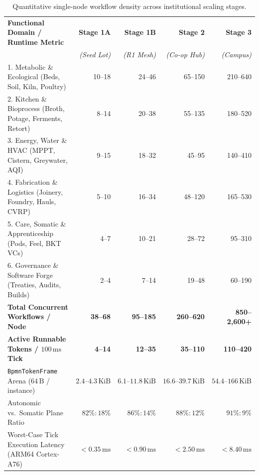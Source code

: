 \begin{table}[htbp]
\centering
\caption{Quantitative single-node workflow density across institutional scaling stages.}
\label{tab:workflow-density-stages}
\footnotesize
\begin{tabular}{@{}lrrrr@{}}
\toprule
\textbf{Functional Domain / Runtime Metric} & \textbf{Stage 1A} & \textbf{Stage 1B} & \textbf{Stage 2} & \textbf{Stage 3} \\
 & \textit{(Seed Lot)} & \textit{(R1 Mesh)} & \textit{(Co-op Hub)} & \textit{(Campus)} \\
\midrule
1. Metabolic \& Ecological (Beds, Soil, Kiln, Poultry) & 10--18 & 24--46 & 65--150 & 210--640 \\
2. Kitchen \& Bioprocess (Broth, Potage, Ferments, Retort) & 8--14 & 20--38 & 55--135 & 180--520 \\
3. Energy, Water \& HVAC (MPPT, Cistern, Greywater, AQI) & 9--15 & 18--32 & 45--95 & 140--410 \\
4. Fabrication \& Logistics (Joinery, Foundry, Hauls, CVRP) & 5--10 & 16--34 & 48--120 & 165--530 \\
5. Care, Somatic \& Apprenticeship (Pods, Feel, BKT VCs) & 4--7 & 10--21 & 28--72 & 95--310 \\
6. Governance \& Software Forge (Treaties, Audits, Builds) & 2--4 & 7--14 & 19--48 & 60--190 \\
\midrule
\textbf{Total Concurrent Workflows / Node} & \textbf{38--68} & \textbf{95--185} & \textbf{260--620} & \textbf{850--2,600+} \\
\textbf{Active Runnable Tokens / $100\,\mathrm{ms}$ Tick} & \textbf{4--14} & \textbf{12--35} & \textbf{35--110} & \textbf{110--420} \\
\texttt{BpmnTokenFrame} Arena ($64\,\mathrm{B}$ / instance) & $2.4\text{--}4.3\,\mathrm{KiB}$ & $6.1\text{--}11.8\,\mathrm{KiB}$ & $16.6\text{--}39.7\,\mathrm{KiB}$ & $54.4\text{--}166\,\mathrm{KiB}$ \\
Autonomic vs.\ Somatic Plane Ratio & $82\% : 18\%$ & $86\% : 14\%$ & $88\% : 12\%$ & $91\% : 9\%$ \\
Worst-Case Tick Execution Latency (ARM64 Cortex-A76) & $< 0.35\,\mathrm{ms}$ & $< 0.90\,\mathrm{ms}$ & $< 2.50\,\mathrm{ms}$ & $< 8.40\,\mathrm{ms}$ \\
\bottomrule
\end{tabular}
\end{table}


